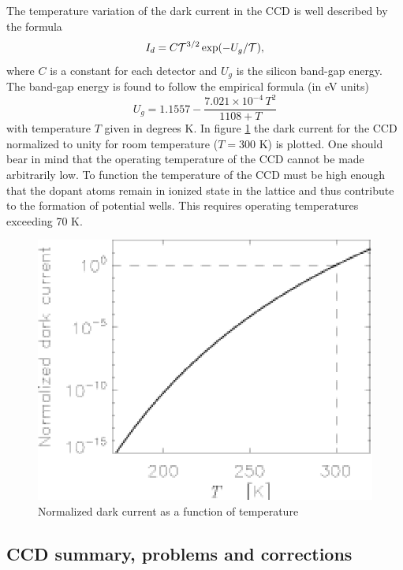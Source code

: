 \documentclass{article}
\def\cl#1{{\cal #1}}               %
\begin{document}
The temperature variation of the dark current in the CCD is well
described by the formula
\begin{equation}
  I_d = C \cl T^{3/2} \exp(-U_g/\cl T),
\end{equation}
where $C$ is a constant for each detector and $U_g$ is the silicon
band-gap energy. The band-gap energy is found to follow the empirical
formula (in eV units)
\begin{equation}
  U_g = 1.1557 - \frac{7.021\times 10^{-4}\, T^2}{1108+T}
\end{equation} 
with temperature $T$ given in degrees K. In figure \ref{CCD.figdark}
the dark current for the CCD normalized to unity for room temperature
($T = 300$ K) is plotted.  One should bear in mind that the operating
temperature of the CCD cannot be made arbitrarily low. To function the
temperature of the CCD must be high enough that the dopant atoms
remain in ionized state in the lattice and thus contribute to the
formation of potential wells. This requires operating temperatures
exceeding 70 K.

\begin{figure}[h]
  \centering
	\includegraphics{CCD_dark.eps}
  \caption{Normalized dark current as a function of temperature }
  \label{CCD.figdark}
\end{figure}

\subsection*{CCD summary, problems and corrections}
\end{document}
